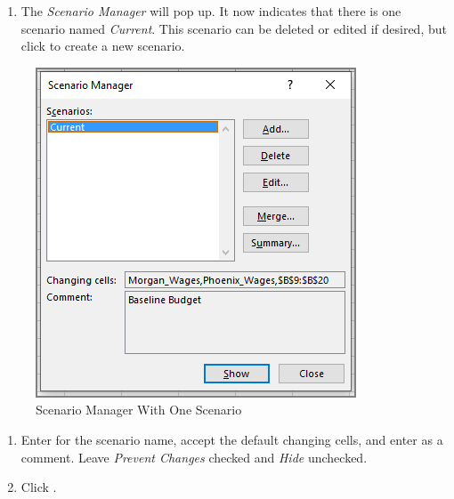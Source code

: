 \begin{enumerate}[resume]	
	
	\item The \textit{Scenario Manager} will pop up. It now indicates that there is one scenario named \textit{Current}. This scenario can be deleted or edited if desired, but click  to create a new scenario.
	
\end{enumerate}

\begin{figure}[H]
	\centering
	\includegraphics[width=\maxwidth{.65\linewidth}]{gfx/ch08_fig53}
	\caption{Scenario Manager With One Scenario}
	\label{08:fig53}
\end{figure}

\begin{enumerate}[resume]	
	
	\item Enter  for the scenario name, accept the default changing cells, and enter  as a comment. Leave \textit{Prevent Changes} checked and \textit{Hide} unchecked.
	\item Click .
	
\end{enumerate}

